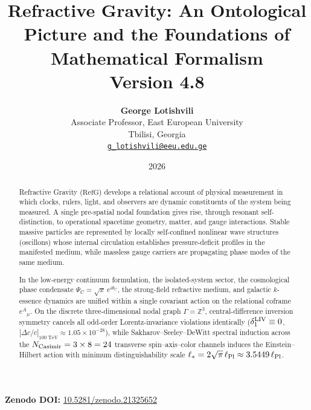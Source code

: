 \documentclass[11pt,a4paper]{article}
\title{\textbf{Refractive Gravity: An Ontological Picture and the Foundations of Mathematical Formalism}\\[0.5em]\large Version 4.8}
\author{\textbf{George Lotishvili}\\
\small Associate Professor, East European University\\
\small Tbilisi, Georgia\\
\small \href{mailto:g_lotishvili@eeu.edu.ge}{\texttt{g\_lotishvili@eeu.edu.ge}}}
\date{2026}
\newcommand{\RefG}{\mathrm{RefG}}
\begin{document}
\maketitle

\begin{center}
\textbf{Zenodo DOI:} \href{https://doi.org/10.5281/zenodo.21325652}{10.5281/zenodo.21325652}
\end{center}

\begin{abstract}
Refractive Gravity ($\RefG$) develops a relational account of physical measurement in which clocks, rulers, light, and observers are dynamic constituents of the system being measured. A single pre-spatial nodal foundation gives rise, through resonant self-distinction, to operational spacetime geometry, matter, and gauge interactions. Stable massive particles are represented by locally self-confined nonlinear wave structures (oscillons) whose internal circulation establishes pressure-deficit profiles in the manifested medium, while massless gauge carriers are propagating phase modes of the same medium.

In the low-energy continuum formulation, the isolated-system sector, the cosmological phase condensate $\Psi_C = \sqrt{x}\,e^{i\theta_C}$, the strong-field refractive medium, and galactic $k$-essence dynamics are unified within a single covariant action on the relational coframe $e^A{}_\mu$. On the discrete three-dimensional nodal graph $\Gamma = \mathbb{Z}^3$, central-difference inversion symmetry cancels all odd-order Lorentz-invariance violations identically ($\delta_1^{\rm LIV} \equiv 0$, $|\Delta c/c|_{100\text{ TeV}} \approx 1.05\times 10^{-28}$), while Sakharov--Seeley--DeWitt spectral induction across the $N_{\rm Casimir} = 3\times 8 = 24$ transverse spin--axis--color channels induces the Einstein--Hilbert action with minimum distinguishability scale $\ell_* = 2\sqrt{\pi}\,\ell_{\rm Pl} \approx 3.5449\,\ell_{\rm Pl}$.


\end{abstract}
\end{document}
